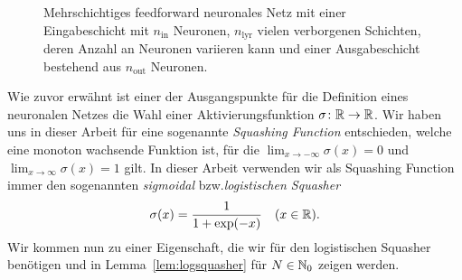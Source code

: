 \begin{center}
\begin{figure}
        \caption{Mehrschichtiges feedforward neuronales Netz mit einer Eingabeschicht mit $n_{\mathrm{in}}$ Neuronen, $n_{\mathrm{lyr}}$ vielen verborgenen Schichten, deren Anzahl an Neuronen variieren kann und einer Ausgabeschicht bestehend aus $n_{\mathrm{out}}$ Neuronen.}
        \label{fig:DNN}
    \end{figure}
\end{center}
Wie zuvor erwähnt ist einer der Ausgangspunkte für die Definition eines neuronalen Netzes die Wahl einer Aktivierungsfunktion $\sigma\colon \mathbb{R} \to \mathbb{R}$. Wir haben uns in dieser Arbeit für eine sogenannte \textit{Squashing Function} entschieden, welche eine monoton wachsende Funktion ist, für die $\lim_{x \to -\infty}\sigma(x) = 0$ und $\lim_{x \to \infty}\sigma(x) = 1$ gilt. In dieser Arbeit verwenden wir als Squashing Function immer den sogenannten \emph{sigmoidal} bzw.\@ \emph{logistischen Squasher}
\begin{align}
\label{logsquasher}
\sigma(x) = \frac{1}{1 + \exp(-x)} \quad (x \in \mathbb{R}).
\end{align}
Wir kommen nun zu einer Eigenschaft, die wir für den logistischen Squasher benötigen und in Lemma~\ref{lem:logsquasher} für $N \in \mathbb{N}_0$ zeigen werden.
